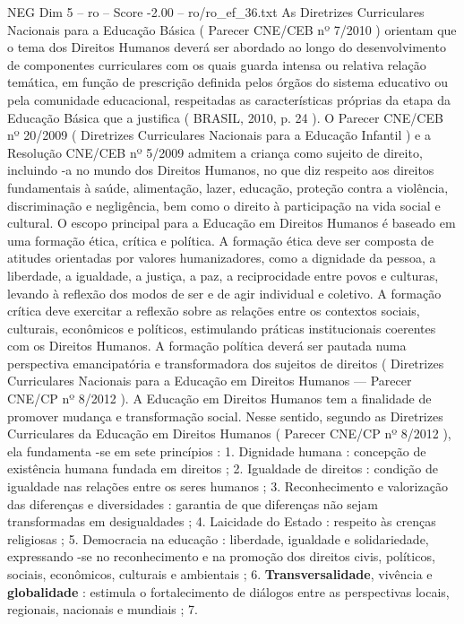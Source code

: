 \begin{textsample}{NEG Dim 5 – ro – Score -2.00 – ro/ro\_ef\_36.txt}
As Diretrizes Curriculares Nacionais para a Educação Básica ( Parecer CNE/CEB nº 7/2010 ) orientam que o tema dos Direitos Humanos deverá ser abordado ao longo do desenvolvimento de componentes curriculares com os quais guarda intensa ou relativa relação temática, em função de prescrição definida pelos órgãos do sistema educativo ou pela comunidade educacional, respeitadas as características próprias da etapa da Educação Básica que a justifica ( BRASIL, 2010, p. 24 ).
O Parecer CNE/CEB nº 20/2009 ( Diretrizes Curriculares Nacionais para a Educação Infantil ) e a Resolução CNE/CEB nº 5/2009 admitem a criança como sujeito de direito, incluindo -a no mundo dos Direitos Humanos, no que diz respeito aos direitos fundamentais à saúde, alimentação, lazer, educação, proteção contra a violência, discriminação e negligência, bem como o direito à participação na vida social e cultural.
O escopo principal para a Educação em Direitos Humanos é baseado em uma formação ética, crítica e política.
A formação ética deve ser composta de atitudes orientadas por valores humanizadores, como a dignidade da pessoa, a liberdade, a igualdade, a justiça, a paz, a reciprocidade entre povos e culturas, levando à reflexão dos modos de ser e de agir individual e coletivo.
A formação crítica deve exercitar a reflexão sobre as relações entre os contextos sociais, culturais, econômicos e políticos, estimulando práticas institucionais coerentes com os Direitos Humanos.
A formação política deverá ser pautada numa perspectiva emancipatória e transformadora dos sujeitos de direitos ( Diretrizes Curriculares Nacionais para a Educação em Direitos Humanos — Parecer CNE/CP nº 8/2012 ).
A Educação em Direitos Humanos tem a finalidade de promover mudança e transformação social.
Nesse sentido, segundo as Diretrizes Curriculares da Educação em Direitos Humanos ( Parecer CNE/CP nº 8/2012 ), ela fundamenta -se em sete princípios : 1.
Dignidade humana : concepção de existência humana fundada em direitos ; 2.
Igualdade de direitos : condição de igualdade nas relações entre os seres humanos ; 3.
Reconhecimento e valorização das diferenças e diversidades : garantia de que diferenças não sejam transformadas em desigualdades ; 4.
Laicidade do Estado : respeito às crenças religiosas ; 5.
Democracia na educação : liberdade, igualdade e solidariedade, expressando -se no reconhecimento e na promoção dos direitos civis, políticos, sociais, econômicos, culturais e ambientais ; 6. \textbf{Transversalidade}, vivência e \textbf{globalidade} : estimula o fortalecimento de diálogos entre as perspectivas locais, regionais, nacionais e mundiais ; 7.

\end{textsample}
